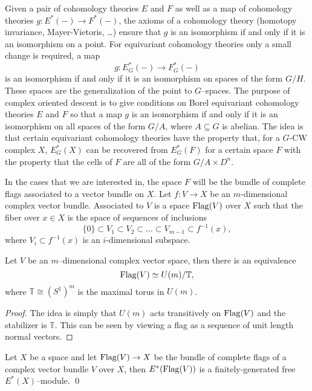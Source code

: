 Given a pair of cohomology theories $E$ and $F$ as well as a map of cohomology theories $g \colon E^*(-) \rightarrow F^*(-)$, the axioms of a cohomology theory (homotopy invariance, Mayer-Vietoris, \ldots) ensure that $g$ is an isomorphism if and only if it is an isomorphism on a point. For equivariant cohomology theories only a small change is required, a map
\[
g \colon E_{G}^*(-) \rightarrow F_{G}^{*}(-)
\]
is an isomorphism if and only if it is an isomorphism on spaces of the form $G/H$. These spaces are the generalization of the point to $G$--spaces. The purpose of complex oriented descent is to give conditions on Borel equivariant cohomology theories $E$ and $F$ so that a map $g$ is an isomorphism if and only if it is an isomorphism on all spaces of the form $G/A$, where $A \subseteq G$ is abelian. The idea is that certain equivariant cohomology theories have the property that, for a $G$-CW complex $X$, $E_{G}^*(X)$ can be recovered from $E_{G}^*(F)$ for a certain space $F$ with the property that the cells of $F$ are all of the form $G/A \times D^n$.

In the cases that we are interested in, the space $F$ will be the bundle of complete flags associated to a vector bundle on $X$. Let $f \colon V \rightarrow X$ be an $m$-dimensional complex vector bundle. Associated to $V$ is a space $\operatorname{Flag}(V)$ over $X$ such that the fiber over $x \in X$ is the space of sequences of inclusions
\[
\{0\} \subset V_1 \subset V_2 \subset \ldots \subset V_{m-1} \subset f^{-1}(x),
\]
where $V_i \subset f^{-1}(x)$ is an $i$-dimensional subspace.

\begin{lemma}
Let $V$ be an $m$--dimensional complex vector space, then there is an equivalence
\[
\operatorname{Flag}(V) \simeq U(m)/\mathbb{T},
\]
where $\mathbb{T} \cong (S^1)^m$ is the maximal torus in $U(m)$.
\end{lemma}
\begin{proof}
The idea is simply that $U(m)$ acts transitively on $\operatorname{Flag}(V)$ and the stabilizer is $\mathbb{T}$. This can be seen by viewing a flag as a sequence of unit length normal vectors.
\end{proof}


\begin{proposition} \label{finitefreeflags}
Let $X$ be a space and let $\operatorname{Flag}(V) \rightarrow X$ be the bundle of complete flags of a complex vector bundle $V$ over $X$, then $E^*(\operatorname{Flag}(V))$ is a finitely-generated free $E^*(X)$--module. \pushQED\qed \qedhere \popQED
\end{proposition}

